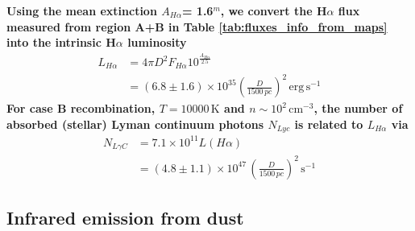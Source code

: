 \documentclass{aa}
\begin{document}
\par \textbf{Using the mean extinction $A_{H\alpha} $= 1.6$^{m}$, we
  convert the H$\alpha$ flux measured from region A+B in Table
  \ref{tab:fluxes_info_from_maps} into the intrinsic
  H$\alpha$ luminosity}
\begin{equation}
\begin{split}
    L_{H\alpha} &= 4\pi D^2 F_{H\alpha} 
    10^{\frac{A_{H\alpha}}{2.5}} \\
    &= (6.8\pm 1.6)\times 10^{35} \left(\frac{D}{1500\, pc}\right)^2\, 
    \mathrm{erg \, s^{-1}}
\end{split}
    \label{eq:Hafluxtoluminos}
\end{equation}
\textbf{For case B recombination, $T=10 000 \, \mathrm{K}$ and
  $n\sim 10^2\,\mathrm{cm^{-3}}$, the number of absorbed (stellar)
  Lyman continuum photons $N_{Lyc}$ is related to $L_{H\alpha}$ via
   \citep[cf.][]{Kennicutt:1994wu} }
\begin{equation}
\begin{split}
    N_{L\gamma C} &=  7.1 \times 10^{11} L(H\alpha)\\
    &=(4.8\pm1.1)\times 10^{47}\, \left(\frac{D}{1500\, pc}\right)^2\, \mathrm{s^{-1}}
    \label{eq:LyafromHa}
\end{split}
\end{equation}


\subsection{Infrared emission from dust}
\end{document}
